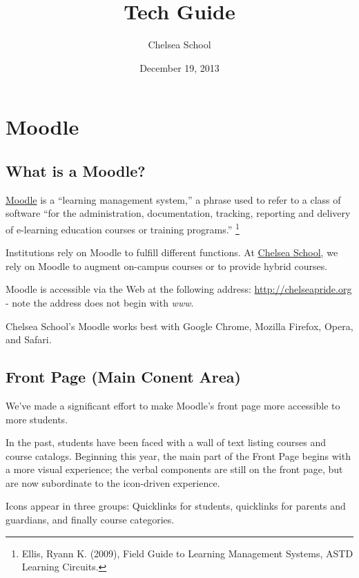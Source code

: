 \documentclass[letterpaper,10pt,english]{sphinxmanual}
\title{Tech Guide}
\date{December 19, 2013}
\author{Chelsea School}
\begin{document}
\maketitle
\tableofcontents
{}\label{Index::doc}



\chapter{Moodle}
\label{moodle::doc}\label{moodle:tech-guide}\label{moodle:moodle}

\section{What is a Moodle?}
\label{moodle:what-is-a-moodle}
\href{https://moodle.org/about/}{Moodle} is a ``learning management system,'' a phrase used to refer to a class of software  ``for the administration, documentation, tracking, reporting and delivery of e-learning education courses or training programs.'' \footnote{
Ellis, Ryann K. (2009), Field Guide to Learning Management Systems, ASTD Learning Circuits.
}

Institutions rely on Moodle to fulfill different functions. At \href{http://chelseaschool.edu}{Chelsea School}, we rely on Moodle to augment on-campus courses or to provide hybrid courses.

Moodle is accessible via the Web at the following address: \href{http://chelseapride.org}{http://chelseapride.org} - note the address does not begin with \emph{www}.

Chelsea School's Moodle works best with Google Chrome, Mozilla Firefox, Opera, and Safari.


\section{Front Page (Main Conent Area)}
\label{moodle:front-page-main-conent-area}
We've made a significant effort to make Moodle's front page more accessible to more students.

In the past, students have been faced with a wall of text listing courses and course catalogs. Beginning this year, the main part of the Front Page begins with a more visual experience; the verbal components are still on the front page, but are now subordinate to the icon-driven experience.

Icons appear in three groups: Quicklinks for students, quicklinks for parents and guardians, and finally course categories.
\end{document}
